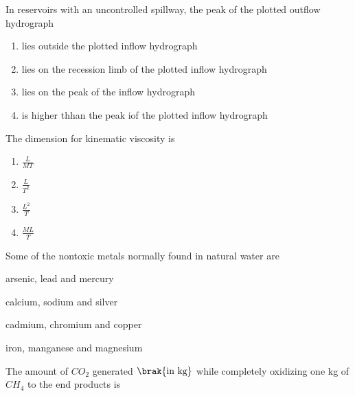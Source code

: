     \item[19.] In reservoirs with an uncontrolled spillway, the peak of the plotted outflow
        hydrograph
        \hfill{}
        \begin{enumerate}
            \item lies outside the plotted inflow hydrograph
            \item lies on the recession limb of the plotted inflow hydrograph
            \item lies on the peak of the inflow hydrograph
            \item is higher thhan the peak iof the plotted inflow hydrograph
        \end{enumerate}
    \item[20.] The dimension for kinematic viscosity is 
        \hfill{}
        \begin{multicols}{4}

            \begin{enumerate}
                \item $\frac{L}{MT}$ 
                \item $\frac{L}{T^2}$ 
                \item $\frac{L^2}{T}$ 
                \item $\frac{ML}{T}$ 
            \end{enumerate}
        \end{multicols}

    \item[21.] Some of the nontoxic metals normally found in natural water are
        \hfill{}
        \begin{enumerate}
                \begin{multicols}{2}
                \item arsenic, lead and mercury
                    \columnbreak
                \item calcium, sodium and silver
                \end{multicols}
                \begin{multicols}{2}
                \item cadmium, chromium and copper 
                    \columnbreak
                \item iron, manganese and magnesium
                \end{multicols}
        \end{enumerate}


    \item[22.] The amount of $CO_2$ generated $\brak{\textnormal{in kg}}$ while completely oxidizing
        one kg of $CH_4$ to the end products is 
        \hfill{}


